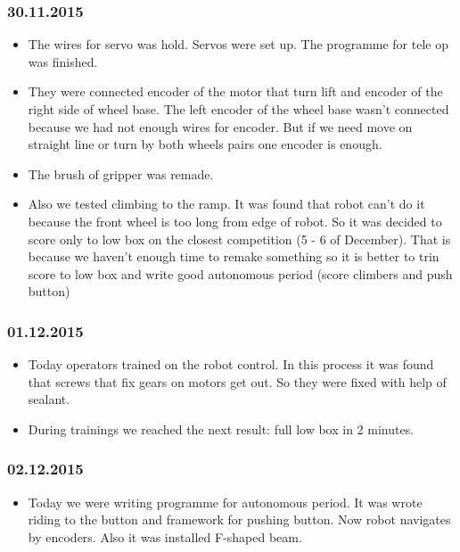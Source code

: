 \subsubsection{30.11.2015}
\begin{itemize}
\item The wires for servo was hold. Servos were set up. The programme for tele op was finished.
\item They were connected encoder of the motor that turn lift and encoder of the right side of wheel base. The left encoder of the wheel base wasn't connected because we had not enough wires for encoder. But if we need move on straight line or turn by both wheels pairs one encoder is enough.
\item The brush of gripper was remade.
\item Also we tested climbing to the ramp. It was found that robot can't do it because the front wheel is too long from edge of robot. So it was decided to score only to low box on the closest competition (5 - 6 of December). That is because we haven't enough time to remake something so it is better to trin score to low box and write good autonomous period (score climbers and push button) 
\end{itemize}
\subsubsection{01.12.2015}
\begin{itemize}
\item Today operators trained on the robot control. In this process it was found that screws that fix gears on motors get out. So they were fixed with help of sealant. 
\item During trainings we reached the next result: full low box in 2 minutes.
\end{itemize}
\subsubsection{02.12.2015}
\begin{itemize}
\item Today we were writing programme for autonomous period. It was wrote riding to the button and framework for pushing button. Now robot navigates by encoders. Also it was installed F-shaped beam.
\end{itemize}
\fillpage